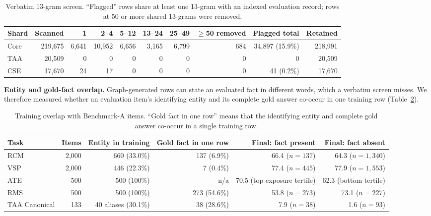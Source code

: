 \documentclass[conference]{IEEEtran}
\begin{document}
\begin{table}[t]
\caption{Verbatim 13-gram screen. ``Flagged'' rows share at least one 13-gram with an indexed evaluation record; rows at 50 or more shared 13-grams were removed.}
\label{tab:contam}
\centering
\scriptsize
\setlength{\tabcolsep}{3.0pt}
\begin{tabular}{@{}lrrrrrrrrr@{}}
\toprule
Shard & Scanned & 1 & 2--4 & 5--12 & 13--24 & 25--49 & $\geq$50 removed & Flagged total & Retained \\
\midrule
Core & 219,675 & 6,641 & 10,952 & 6,656 & 3,165 & 6,799 & 684 & 34,897 (15.9\%) & 218,991 \\
TAA & 20,509 & 0 & 0 & 0 & 0 & 0 & 0 & 0 & 20,509 \\
CSE & 17,670 & 24 & 17 & 0 & 0 & 0 & 0 & 41 (0.2\%) & 17,670 \\
\bottomrule
\end{tabular}
\end{table}

\textbf{Entity and gold-fact overlap.} Graph-generated rows can state an evaluated fact in different words, which a verbatim screen misses. We therefore measured whether an evaluation item's identifying entity and its complete gold answer co-occur in one training row (Table~\ref{tab:overlap}).

\begin{table}[t]
\caption{Training overlap with Benchmark-A items. ``Gold fact in one row'' means that the identifying entity and complete gold answer co-occur in a single training row.}
\label{tab:overlap}
\centering
\scriptsize
\setlength{\tabcolsep}{3.5pt}
\begin{tabular}{@{}lrrrrr@{}}
\toprule
Task & Items & Entity in training & Gold fact in one row & Final: fact present & Final: fact absent \\
\midrule
RCM & 2,000 & 660 (33.0\%) & 137 (6.9\%) & 66.4 ($n=137$) & 64.3 ($n=1,340$) \\
VSP & 2,000 & 446 (22.3\%) & 7 (0.4\%) & 77.4 ($n=445$) & 77.9 ($n=1,553$) \\
ATE & 500 & 500 (100\%) & n/a & 70.5 (top exposure tertile) & 62.3 (bottom tertile) \\
RMS & 500 & 500 (100\%) & 273 (54.6\%) & 53.8 ($n=273$) & 73.1 ($n=227$) \\
TAA Canonical & 133 & 40 aliases (30.1\%) & 38 (28.6\%) & 7.9 ($n=38$) & 1.6 ($n=93$) \\
\bottomrule
\end{tabular}
\end{table}
\end{document}
